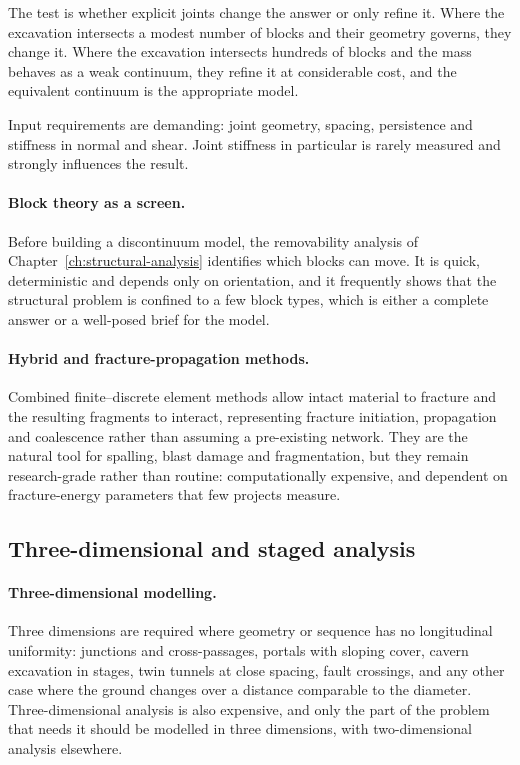 The test is whether explicit joints change the answer or only refine it.
Where the excavation intersects a modest number of blocks and their geometry
governs, they change it. Where the excavation intersects hundreds of blocks
and the mass behaves as a weak continuum, they refine it at considerable cost,
and the equivalent continuum is the appropriate model.

Input requirements are demanding: joint geometry, spacing, persistence and
stiffness in normal and shear. Joint stiffness in particular is rarely
measured and strongly influences the result.

\paragraph{Block theory as a screen.}
Before building a discontinuum model, the removability analysis of
Chapter~\ref{ch:structural-analysis} identifies which blocks can move.
It is quick, deterministic and depends only on orientation, and it frequently
shows that the structural problem is confined to a few block types, which
is either a complete answer or a well-posed brief for the model.

\paragraph{Hybrid and fracture-propagation methods.}
Combined finite--discrete element methods allow intact material to fracture
and the resulting fragments to interact, representing fracture initiation,
propagation and coalescence rather than assuming a pre-existing network. They
are the natural tool for spalling, blast damage and fragmentation, but they
remain research-grade rather than routine: computationally expensive, and
dependent on fracture-energy parameters that few projects measure.

\subsection{Three-dimensional and staged analysis}
\label{sec:three-dimensional-staged}

\paragraph{Three-dimensional modelling.}
Three dimensions are required where geometry or sequence has no longitudinal
uniformity: junctions and cross-passages, portals with sloping cover, cavern
excavation in stages, twin tunnels at close spacing, fault crossings, and any
other case where the ground changes over a distance comparable to the
diameter.
Three-dimensional analysis is also expensive, and only the part of the
problem that needs it should be modelled in three dimensions, with
two-dimensional analysis elsewhere.

